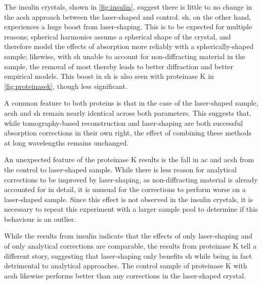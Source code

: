 The insulin crystals, shown in \cref{fig:insulin}, suggest there is little to no change in the \ac{acsh} approach between the laser-shaped and control. \Ac{sh}, on the other hand, experiences a huge boost from laser-shaping. This is to be expected for multiple reasons; spherical harmonics assume a spherical shape of the crystal, and therefore model the effects of absorption more reliably with a spherically-shaped sample; likewise, with \ac{sh} unable to account for non-diffracting material in the sample, the removal of most thereby leads to better diffraction and better empirical models. This boost in \ac{sh} is also seen with proteinase K in \cref{fig:proteinasek}, though less significant.

A common feature to both proteins is that in the case of the laser-shaped sample, \ac{acsh} and \ac{sh} remain nearly identical across both parameters.
This suggests that, while tomography-based reconstruction and laser-shaping are both successful absorption corrections in their own right, the effect of combining these methods at long wavelengths remains unchanged.

An unexpected feature of the proteinase K results is the fall in \ac{ac} and \ac{acsh} from the control to laser-shaped sample. While there is less reason for analytical corrections to be improved by laser-shaping, as non-diffracting material is already accounted for in detail, it is unusual for the corrections to perform worse on a laser-shaped sample. Since this effect is not observed in the insulin crystals, it is necessary to repeat this experiment with a larger sample pool to determine if this behaviour is an outlier.%

While the results from insulin indicate that the effects of only laser-shaping and of only analytical corrections are comparable, the results from proteinase K tell a different story, suggesting that laser-shaping only benefits \ac{sh} while being in fact detrimental to analytical approaches. The control sample of proteinase K with \ac{acsh} likewise performs better than any corrections in the laser-shaped crystal. %


